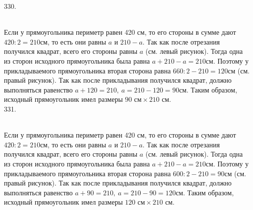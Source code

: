 \documentclass[12pt]{article}
\begin{document}
330.\begin{figure}[ht!]
\end{figure}\\
Если у прямоугольника периметр равен 420 см, то его стороны в сумме дают $420:2=210$см, то есть они равны $a$ и $210-a.$ Так как после отрезания получился квадрат, всего его стороны равны $a$ (см. левый рисунок). Тогда одна из сторон исходного прямоугольника была равна $a+210-a=210$см. Поэтому у прикладываемого прямоугольника вторая сторона равна $660:2-210=120$см (см. правый рисунок). Так как после прикладывания получился квадрат, должно выполняться равенство $a+120=210,\ a=210-120=90$см. Таким образом, исходный прямоугольник имел размеры $90\text{ см}\times210\text{ см}.$\\
331.\begin{figure}[ht!]
\end{figure}\\
Если у прямоугольника периметр равен 420 см, то его стороны в сумме дают $420:2=210$см, то есть они равны $a$ и $210-a.$ Так как после отрезания получился квадрат, всего его стороны равны $a$ (см. левый рисунок). Тогда одна из сторон исходного прямоугольника была равна $a+210-a=210$см. Поэтому у прикладываемого прямоугольника вторая сторона равна $600:2-210=90$см (см. правый рисунок). Так как после прикладывания получился квадрат, должно выполняться равенство $a+90=210,\ a=210-90=120$см. Таким образом, исходный прямоугольник имел размеры $120\text{ см}\times210\text{ см}.$\\
\end{document}
